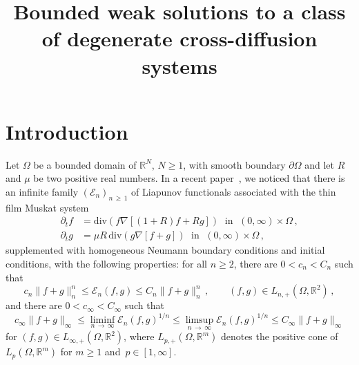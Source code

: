 \documentclass[AHL,Unicode,longabstracts,published]{cedram}
\title[Bounded weak solutions to a class of degenerate cross-diffusion systems]{Bounded weak solutions to a class of degenerate cross-diffusion systems}
\author[\initial{Ph.} \lastname{Laurençot}]{\firstname{Philippe} \lastname{Laurençot}}
\author[\initial{B.-V.} \lastname{Matioc}]{\firstname{Bogdan-Vasile} \lastname{Matioc}}
\newcommand{\bbR}{\mathbb{R}}
\newcommand{\clE}{\mathcal{E}}
\newcommand{\divv}{\mathrm{div}}
\newcommand{\clE}{\mathcal{E}}
\begin{document}
\maketitle



\section{Introduction}\label{sec1}



Let $\Omega$ be a bounded domain of $\bbR^N$, $N\ge 1$, with smooth boundary $\partial\Omega$ and let $R$ and $\mu$ be two positive real numbers. In a recent paper~\cite{LM22}, we noticed that there is an infinite family $(\clE_n)_{n\,\ge\,1}$ of Liapunov functionals associated with the thin film Muskat system
\begin{align*}
\partial_t f & = \divv\left(f \nabla\left[(1+R)f + R g \right] \right) \;\text{ in }\; (0,\infty)\times \Omega\,, \\
\partial_t g & = \mu R\, \divv\left(g \nabla\left[f + g \right] \right) \;\text{ in }\; (0,\infty)\times \Omega\,,
\end{align*}
supplemented with homogeneous Neumann boundary conditions and initial conditions, with the following properties: for all $n\ge 2$, there are $0<c_n < C_n$ such that
\begin{equation*}
c_n \|f+g\|_n^n \le \clE_n(f,g) \le C_n \|f+g\|_n ^n\,, \qquad (f,g)\in L_{n,+}\left(\Omega,\bbR^2\right)\,,
\end{equation*}
and there are $0<c_\infty < C_\infty$ such that
\begin{equation*}
c_\infty \|f+g\|_\infty \le \liminf_{n\,\to\,\infty} \clE_n(f,g)^{1/n} \le \limsup_{n\,\to\,\infty} \clE_n(f,g)^{1/n} \le C_\infty \|f+g\|_\infty
\end{equation*}
for $(f,g)\in L_{\infty,+}(\Omega,\bbR^2)$, where $L_{p,+}(\Omega,\bbR^m)$ denotes the positive cone of $L_p(\Omega,\bbR^m)$ for $m\ge 1$ and~${p\in [1,\infty]}$.
\end{document}
